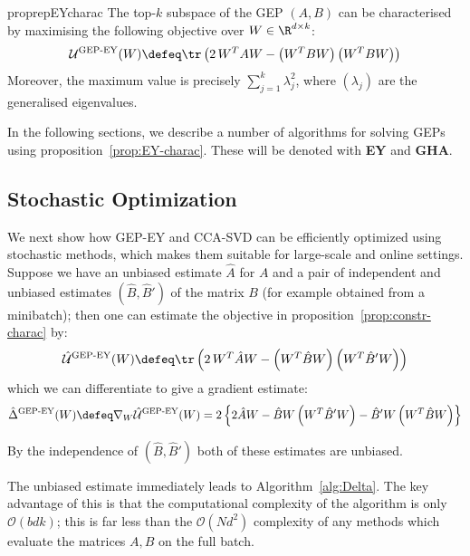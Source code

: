 \begin{restatable}{proprep}{EYcharac}
    \label{prop:EY-charac}
    The top-$k$ subspace of the GEP $(A,B)$ can be characterised by maximising the following objective over $W \in \R^{d \times k}$:
    \begin{align}
        \mathcal{U}^\text{GEP-EY}(W) \defeq \tr \left( 2\, W^T A W - \left(W^T B W\right) \left(W^T B W\right) \right)
    \end{align}
    Moreover, the maximum value is precisely $\sum_{j=1}^k \lambda_j^2$, where $(\lambda_j)$ are the generalised eigenvalues.
\end{restatable}


In the following sections, we describe a number of algorithms for solving GEPs using proposition~\ref{prop:EY-charac}.
These will be denoted with \textbf{EY} and \textbf{GHA}.

\subsection{Stochastic Optimization}

We next show how GEP-EY and CCA-SVD can be efficiently optimized using stochastic methods, which makes them suitable for large-scale and online settings.
Suppose we have an unbiased estimate $\hat{A}$ for $A$ and a pair of independent and unbiased estimates $(\hat{B},\hat{B}')$ of the matrix $B$ (for example obtained from a minibatch); then one can estimate the objective in proposition~\ref{prop:constr-charac} by:
\begin{align}
    \hat{\mathcal{U}}^\text{GEP-EY}(W) \defeq \tr \left( 2\, W^T \hat{A} W - \left(W^T \hat{B} W\right) \left(W^T \hat{B}' W\right) \right)
\end{align}
which we can differentiate to give a gradient estimate:
\begin{align}\label{eq:GEP-EY-grad}
    \hat{\Delta}^{\text{GEP-EY}}(W)
    \defeq \nabla_W \hat{\mathcal{U}}^\text{GEP-EY}(W)
    = 2 \left\{ 2 \hat{A} W - \hat{B} W \left(W^T \hat{B}' W \right) - \hat{B}' W \left(W^T \hat{B} W \right) \right\}
\end{align}

By the independence of $(\hat{B},\hat{B}')$ both of these estimates are unbiased.

The unbiased estimate immediately leads to Algorithm~\ref{alg:Delta}.
The key advantage of this is that the computational complexity of the algorithm is only $\mathcal{O}(b d k)$; this is far less than the $\mathcal{O}(N d^2)$ complexity of any methods which evaluate the matrices $A,B$ on the full batch.

